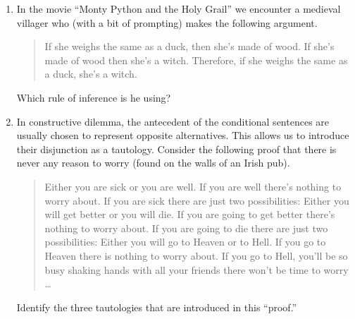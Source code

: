 \begin{enumerate}

\item In the movie ``Monty Python and the Holy Grail'' we encounter
a medieval villager who (with a bit of prompting) makes the 
following argument.

\begin{quote}
If she weighs the same as a duck, then she's made of wood. \newline
If she's made of wood then she's a witch. \newline
Therefore, if she weighs the same as a duck, she's a witch.
\end{quote} 

Which rule of inference is he using?


\item In constructive dilemma, the antecedent of the conditional 
sentences are usually chosen to represent opposite alternatives. 
This allows us to introduce their disjunction as a tautology. 
Consider the following proof that there is never any reason to worry
(found on the walls of an Irish pub).

\begin{quote}
Either you are sick or you are well. \newline
If you are well there's nothing to worry about. \newline
If you are sick there are just two possibilities: \newline
Either you will get better or you will die. \newline
If you are going to get better there's nothing to worry about. \newline
If you are going to die there are just two possibilities:\newline
Either you will go to Heaven or to Hell. \newline
If you go to Heaven there is nothing to worry about.
If you go to Hell, you'll be so busy shaking hands with all your friends there won't be time to worry \ldots
\end{quote}

Identify the three tautologies that are introduced in this ``proof.''


\textbookpagebreak


\end{enumerate}
